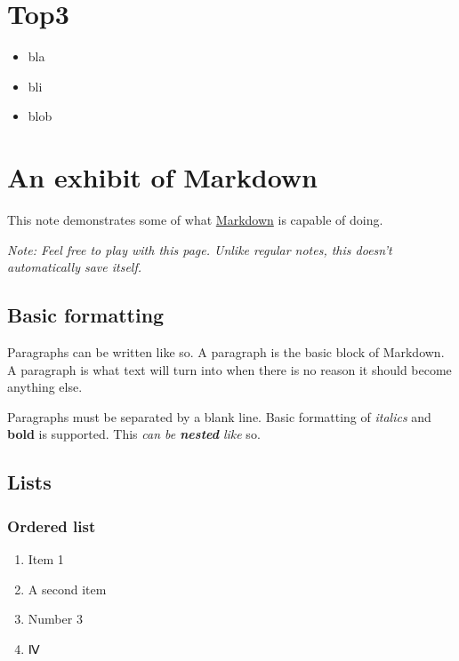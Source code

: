 \hypertarget{top3}{%
\section{Top3}\label{top3}}

\begin{itemize}
\item
  bla
\item
  bli
\item
  blob
\end{itemize}

\hypertarget{an-exhibit-of-markdown}{%
\section{An exhibit of Markdown}\label{an-exhibit-of-markdown}}

This note demonstrates some of what
\href{http://daringfireball.net/projects/markdown/}{Markdown} is capable
of doing.

\emph{Note: Feel free to play with this page. Unlike regular notes, this
doesn't automatically save itself.}

\hypertarget{basic-formatting}{%
\subsection{Basic formatting}\label{basic-formatting}}

Paragraphs can be written like so. A paragraph is the basic block of
Markdown. A paragraph is what text will turn into when there is no
reason it should become anything else.

Paragraphs must be separated by a blank line. Basic formatting of
\emph{italics} and \textbf{bold} is supported. This \emph{can be
\textbf{nested} like} so.

\hypertarget{lists}{%
\subsection{Lists}\label{lists}}

\hypertarget{ordered-list}{%
\subsubsection{Ordered list}\label{ordered-list}}

\begin{enumerate}
\def\labelenumi{\arabic{enumi}.}
\tightlist
\item
  Item 1
\item
  A second item
\item
  Number 3
\item
  Ⅳ
\end{enumerate}

